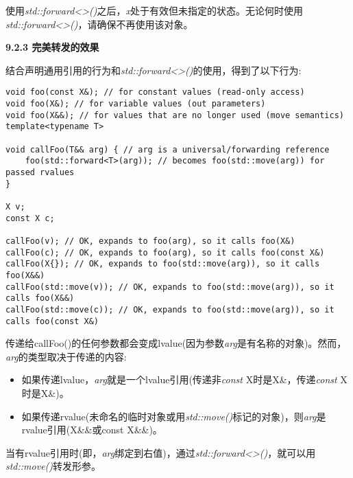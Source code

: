 使用\textit{std::forward<>()}之后，\textit{x}处于有效但未指定的状态。无论何时使用\textit{std::forward<>()}，请确保不再使用该对象。\par

\hspace*{\fill} \par %
\textbf{9.2.3 完美转发的效果}

结合声明通用引用的行为和\textit{std::forward<>()}的使用，得到了以下行为:\par

\begin{lstlisting}[caption={}]
void foo(const X&); // for constant values (read-only access)
void foo(X&); // for variable values (out parameters)
void foo(X&&); // for values that are no longer used (move semantics)
template<typename T>

void callFoo(T&& arg) { // arg is a universal/forwarding reference
	foo(std::forward<T>(arg)); // becomes foo(std::move(arg)) for passed rvalues
}

X v;
const X c;

callFoo(v); // OK, expands to foo(arg), so it calls foo(X&)
callFoo(c); // OK, expands to foo(arg), so it calls foo(const X&)
callFoo(X{}); // OK, expands to foo(std::move(arg)), so it calls foo(X&&)
callFoo(std::move(v)); // OK, expands to foo(std::move(arg)), so it calls foo(X&&)
callFoo(std::move(c)); // OK, expands to foo(std::move(arg)), so it calls foo(const X&)
\end{lstlisting}

传递给callFoo()的任何参数都会变成lvalue(因为参数\textit{arg}是有名称的对象)。然而，\textit{arg}的类型取决于传递的内容:\par

\begin{itemize}
	\item 如果传递lvalue，\textit{arg}就是一个lvalue引用(传递非\textit{const} X时是X\&，传递\textit{const} X时是X\&)。
	\item 如果传递rvalue(未命名的临时对象或用\textit{std::move()}标记的对象)，则\textit{arg}是rvalue引用(X\&\&或const X\&\&)。
\end{itemize}

当有rvalue引用时(即，\textit{arg}绑定到右值)，通过\textit{std::forward<>()}，就可以用\textit{std::move()}转发形参。\par





















